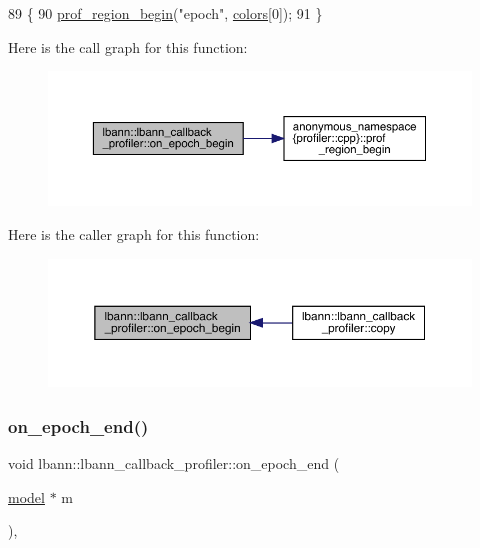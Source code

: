 \begin{DoxyCode}
89                                                      \{
90   \hyperlink{namespaceanonymous__namespace_02profiler_8cpp_03_ad2ea0278cd1f25dc30ddd76194ace64b}{prof\_region\_begin}(\textcolor{stringliteral}{"epoch"}, \hyperlink{classlbann_1_1lbann__callback__profiler_addf3323ce665956dc4988e3850bceb30}{colors}[0]);
91 \}
\end{DoxyCode}
Here is the call graph for this function\+:\nopagebreak
\begin{figure}[H]
\begin{center}
\leavevmode
\includegraphics[width=350pt]{classlbann_1_1lbann__callback__profiler_abd30d11df631eea086cdf213c9f0f4f9_cgraph}
\end{center}
\end{figure}
Here is the caller graph for this function\+:\nopagebreak
\begin{figure}[H]
\begin{center}
\leavevmode
\includegraphics[width=350pt]{classlbann_1_1lbann__callback__profiler_abd30d11df631eea086cdf213c9f0f4f9_icgraph}
\end{center}
\end{figure}
\mbox{\label{classlbann_1_1lbann__callback__profiler_a86e0fbe550ff42660766977604d9d5a6}} 
\subsubsection{\texorpdfstring{on\+\_\+epoch\+\_\+end()}{on\_epoch\_end()}}
{\footnotesize\ttfamily void lbann\+::lbann\+\_\+callback\+\_\+profiler\+::on\+\_\+epoch\+\_\+end (\begin{DoxyParamCaption}\item[{\hyperlink{classlbann_1_1model}{model} $\ast$}]{m }\end{DoxyParamCaption})\hspace{0.3cm}{\ttfamily [override]}, {\ttfamily [virtual]}}

